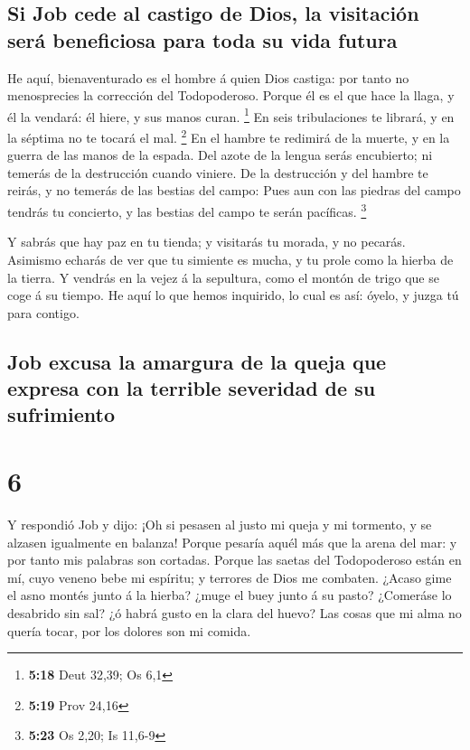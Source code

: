\hypertarget{si-job-cede-al-castigo-de-dios-la-visitaciuxf3n-seruxe1-beneficiosa-para-toda-su-vida-futura}{%
\subsection{Si Job cede al castigo de Dios, la visitación será
beneficiosa para toda su vida
futura}\label{si-job-cede-al-castigo-de-dios-la-visitaciuxf3n-seruxe1-beneficiosa-para-toda-su-vida-futura}}

 He aquí, bienaventurado es el hombre á quien Dios castiga:
por tanto no menosprecies la corrección del Todopoderoso. 
Porque él es el que hace la llaga, y él la vendará: él hiere, y sus
manos curan. \footnote{\textbf{5:18} Deut 32,39; Os 6,1} 
En seis tribulaciones te librará, y en la séptima no te tocará el mal.
\footnote{\textbf{5:19} Prov 24,16}  En el hambre te
redimirá de la muerte, y en la guerra de las manos de la espada.
 Del azote de la lengua serás encubierto; ni temerás de la
destrucción cuando viniere.  De la destrucción y del hambre
te reirás, y no temerás de las bestias del campo:  Pues aun
con las piedras del campo tendrás tu concierto, y las bestias del campo
te serán pacíficas. \footnote{\textbf{5:23} Os 2,20; Is 11,6-9}

 Y sabrás que hay paz en tu tienda; y visitarás tu morada,
y no pecarás.  Asimismo echarás de ver que tu simiente es
mucha, y tu prole como la hierba de la tierra.  Y vendrás
en la vejez á la sepultura, como el montón de trigo que se coge á su
tiempo.  He aquí lo que hemos inquirido, lo cual es así:
óyelo, y juzga tú para contigo.

\hypertarget{job-excusa-la-amargura-de-la-queja-que-expresa-con-la-terrible-severidad-de-su-sufrimiento}{%
\subsection{Job excusa la amargura de la queja que expresa con la
terrible severidad de su
sufrimiento}\label{job-excusa-la-amargura-de-la-queja-que-expresa-con-la-terrible-severidad-de-su-sufrimiento}}

\hypertarget{section-5}{%
\section{6}\label{section-5}}

 Y respondió Job y dijo:  ¡Oh si pesasen al
justo mi queja y mi tormento, y se alzasen igualmente en balanza!
 Porque pesaría aquél más que la arena del mar: y por tanto
mis palabras son cortadas.  Porque las saetas del
Todopoderoso están en mí, cuyo veneno bebe mi espíritu; y terrores de
Dios me combaten.  ¿Acaso gime el asno montés junto á la
hierba? ¿muge el buey junto á su pasto?  ¿Comeráse lo
desabrido sin sal? ¿ó habrá gusto en la clara del huevo? 
Las cosas que mi alma no quería tocar, por los dolores son mi comida.

